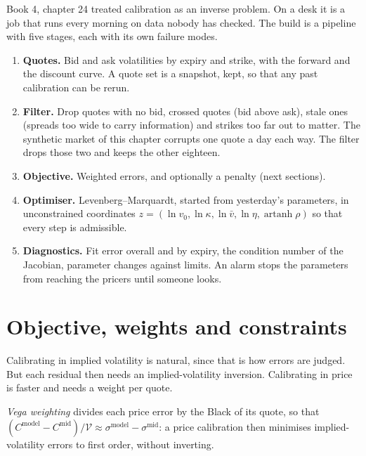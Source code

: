 Book 4, chapter 24 treated calibration as an inverse problem. On a desk it is a job that runs every morning on data nobody has checked. The
build is a pipeline with five stages, each with its own failure modes.
\begin{enumerate}
\item \textbf{Quotes.} Bid and ask volatilities by expiry and strike, with the forward and the discount curve. A quote set is a snapshot,
kept, so that any past calibration can be rerun.
\item \textbf{Filter.} Drop quotes with no bid, crossed quotes (bid above ask), stale ones (spreads too wide to carry information) and
strikes too far out to matter. The synthetic market of this chapter corrupts one quote a day each way. The filter drops those two and keeps
the other eighteen.
\item \textbf{Objective.} Weighted errors, and optionally a penalty (next sections).
\item \textbf{Optimiser.} Levenberg--Marquardt, started from yesterday's parameters, in unconstrained coordinates
$z=(\ln v_0,\ln\kappa,\ln\bar v,\ln\eta,\operatorname{artanh}\rho)$ so that every step is admissible.
\item \textbf{Diagnostics.} Fit error overall and by expiry, the condition number of the Jacobian, parameter changes against limits. An alarm
stops the parameters from reaching the pricers until someone looks.
\end{enumerate}

\section{Objective, weights and constraints}

Calibrating in implied volatility is natural, since that is how errors are judged. But each residual then needs an implied-volatility
inversion. Calibrating in price is faster and needs a weight per quote.

\begin{definition}\label{def:dv:fourier-pricing-and-calibration-engineering:vega}
\emph{Vega weighting} divides each price error by the Black  of its quote, so that $(C^{\text{model}}-C^{\text{mid}})/
\mathcal V\approx\sigma^{\text{model}}-\sigma^{\text{mid}}$: a price calibration then minimises implied-volatility errors to first order,
without inverting.
\end{definition}

